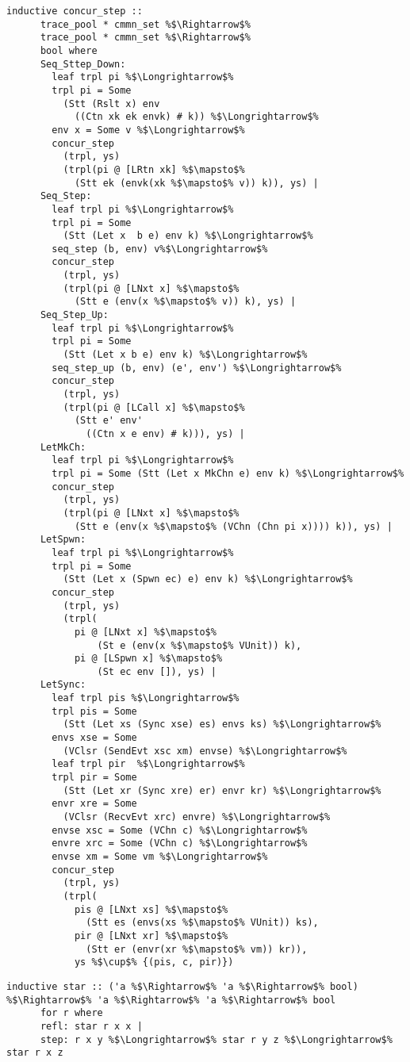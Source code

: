 \documentclass{article}
\begin{document}
\begin{lstlisting}[style=codestyle1, escapechar=\%]
    inductive concur_step ::
      trace_pool * cmmn_set %$\Rightarrow$%
      trace_pool * cmmn_set %$\Rightarrow$%
      bool where 
      Seq_Sttep_Down:
        leaf trpl pi %$\Longrightarrow$%
        trpl pi = Some
          (Stt (Rslt x) env
            ((Ctn xk ek envk) # k)) %$\Longrightarrow$%
        env x = Some v %$\Longrightarrow$%
        concur_step
          (trpl, ys)
          (trpl(pi @ [LRtn xk] %$\mapsto$%
            (Stt ek (envk(xk %$\mapsto$% v)) k)), ys) |
      Seq_Step:
        leaf trpl pi %$\Longrightarrow$%
        trpl pi = Some
          (Stt (Let x  b e) env k) %$\Longrightarrow$%
        seq_step (b, env) v%$\Longrightarrow$%
        concur_step
          (trpl, ys)
          (trpl(pi @ [LNxt x] %$\mapsto$%
            (Stt e (env(x %$\mapsto$% v)) k), ys) |
      Seq_Step_Up: 
        leaf trpl pi %$\Longrightarrow$%
        trpl pi = Some
          (Stt (Let x b e) env k) %$\Longrightarrow$%
        seq_step_up (b, env) (e', env') %$\Longrightarrow$%
        concur_step
          (trpl, ys)
          (trpl(pi @ [LCall x] %$\mapsto$%
            (Stt e' env'
              ((Ctn x e env) # k))), ys) |
      LetMkCh: 
        leaf trpl pi %$\Longrightarrow$%
        trpl pi = Some (Stt (Let x MkChn e) env k) %$\Longrightarrow$%
        concur_step
          (trpl, ys)
          (trpl(pi @ [LNxt x] %$\mapsto$%
            (Stt e (env(x %$\mapsto$% (VChn (Chn pi x)))) k)), ys) |
      LetSpwn:
        leaf trpl pi %$\Longrightarrow$%
        trpl pi = Some
          (Stt (Let x (Spwn ec) e) env k) %$\Longrightarrow$%
        concur_step
          (trpl, ys)
          (trpl(
            pi @ [LNxt x] %$\mapsto$%
                (St e (env(x %$\mapsto$% VUnit)) k), 
            pi @ [LSpwn x] %$\mapsto$%
                (St ec env []), ys) |
      LetSync:
        leaf trpl pis %$\Longrightarrow$%
        trpl pis = Some
          (Stt (Let xs (Sync xse) es) envs ks) %$\Longrightarrow$%
        envs xse = Some
          (VClsr (SendEvt xsc xm) envse) %$\Longrightarrow$%
        leaf trpl pir  %$\Longrightarrow$%
        trpl pir = Some
          (Stt (Let xr (Sync xre) er) envr kr) %$\Longrightarrow$%
        envr xre = Some
          (VClsr (RecvEvt xrc) envre) %$\Longrightarrow$%
        envse xsc = Some (VChn c) %$\Longrightarrow$%
        envre xrc = Some (VChn c) %$\Longrightarrow$%
        envse xm = Some vm %$\Longrightarrow$%
        concur_step
          (trpl, ys)
          (trpl(
            pis @ [LNxt xs] %$\mapsto$%
              (Stt es (envs(xs %$\mapsto$% VUnit)) ks), 
            pir @ [LNxt xr] %$\mapsto$%
              (Stt er (envr(xr %$\mapsto$% vm)) kr)), 
            ys %$\cup$% {(pis, c, pir)})

    \end{lstlisting}

  \begin{lstlisting}[style=codestyle1, escapechar=\%]
    inductive star :: ('a %$\Rightarrow$% 'a %$\Rightarrow$% bool) %$\Rightarrow$% 'a %$\Rightarrow$% 'a %$\Rightarrow$% bool
      for r where
      refl: star r x x |
      step: r x y %$\Longrightarrow$% star r y z %$\Longrightarrow$% star r x z
    \end{lstlisting}
\end{document}
